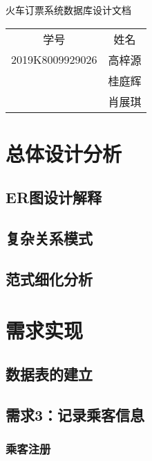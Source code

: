 \documentclass[UTF-8,twoside,c5size]{ctexart}
\def\hfparagraph#1{\paragraph{#1} \hfill}
\begin{document}
	\begin{center}
		\heiti{} 火车订票系统数据库设计文档
	\end{center}

	\begin{table*}[!h]
		\raggedleft
		\begin{tabular}{cc}
			{\heiti 学号} & {\heiti 姓名} \\
			2019K8009929026 & 高梓源 \\
			& 桂庭辉 \\
			& 肖展琪
		\end{tabular}
	\end{table*}
	
	\section{总体设计分析}
	
	\subsection{ER图设计解释}
	
	\subsection{复杂关系模式}
	
	\subsection{范式细化分析}
	
	\section{需求实现}
	
	\subsection{数据表的建立}
	
	\subsection{需求3：记录乘客信息}
	
	\subsubsection{乘客注册}
	
	
\end{document}
